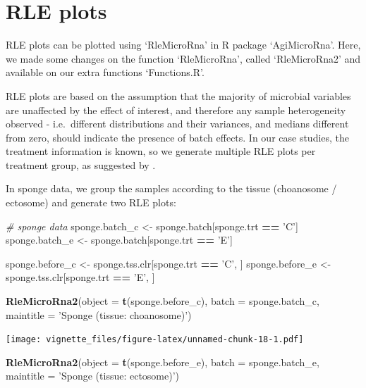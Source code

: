 \documentclass[]{book}
\newenvironment{Shaded}{\begin{snugshade}}{\end{snugshade}}
\newcommand{\KeywordTok}[1]{\textcolor[rgb]{0.13,0.29,0.53}{\textbf{#1}}}
\newcommand{\DataTypeTok}[1]{\textcolor[rgb]{0.13,0.29,0.53}{#1}}
\newcommand{\StringTok}[1]{\textcolor[rgb]{0.31,0.60,0.02}{#1}}
\newcommand{\CommentTok}[1]{\textcolor[rgb]{0.56,0.35,0.01}{\textit{#1}}}
\newcommand{\OperatorTok}[1]{\textcolor[rgb]{0.81,0.36,0.00}{\textbf{#1}}}
\newcommand{\NormalTok}[1]{#1}
\begin{document}
\section{RLE plots}\label{rle-plots}

RLE plots can be plotted using `RleMicroRna' in R package `AgiMicroRna'.
Here, we made some changes on the function `RleMicroRna', called
`RleMicroRna2' and available on our extra functions `Functions.R'.

RLE plots are based on the assumption that the majority of microbial
variables are unaffected by the effect of interest, and therefore any
sample heterogeneity observed - i.e.~different distributions and their
variances, and medians different from zero, should indicate the presence
of batch effects. In our case studies, the treatment information is
known, so we generate multiple RLE plots per treatment group, as
suggested by \citep{lin2018scmerge}.

In sponge data, we group the samples according to the tissue (choanosome
/ ectosome) and generate two RLE plots:

\begin{Shaded}
\begin{Highlighting}[]
\CommentTok{# sponge data}
\NormalTok{sponge.batch_c <-}\StringTok{ }\NormalTok{sponge.batch[sponge.trt }\OperatorTok{==}\StringTok{ 'C'}\NormalTok{]}
\NormalTok{sponge.batch_e <-}\StringTok{ }\NormalTok{sponge.batch[sponge.trt }\OperatorTok{==}\StringTok{ 'E'}\NormalTok{] }

\NormalTok{sponge.before_c <-}\StringTok{ }\NormalTok{sponge.tss.clr[sponge.trt }\OperatorTok{==}\StringTok{ 'C'}\NormalTok{, ]}
\NormalTok{sponge.before_e <-}\StringTok{ }\NormalTok{sponge.tss.clr[sponge.trt }\OperatorTok{==}\StringTok{ 'E'}\NormalTok{, ] }


\KeywordTok{RleMicroRna2}\NormalTok{(}\DataTypeTok{object =} \KeywordTok{t}\NormalTok{(sponge.before_c), }\DataTypeTok{batch =}\NormalTok{ sponge.batch_c, }
             \DataTypeTok{maintitle =} \StringTok{'Sponge (tissue: choanosome)'}\NormalTok{)}
\end{Highlighting}
\end{Shaded}

\texttt{[image: vignette\_files/figure-latex/unnamed-chunk-18-1.pdf]}

\begin{Shaded}
\begin{Highlighting}[]
\KeywordTok{RleMicroRna2}\NormalTok{(}\DataTypeTok{object =} \KeywordTok{t}\NormalTok{(sponge.before_e), }\DataTypeTok{batch =}\NormalTok{ sponge.batch_e, }
             \DataTypeTok{maintitle =} \StringTok{'Sponge (tissue: ectosome)'}\NormalTok{)}
\end{Highlighting}
\end{Shaded}
\end{document}
